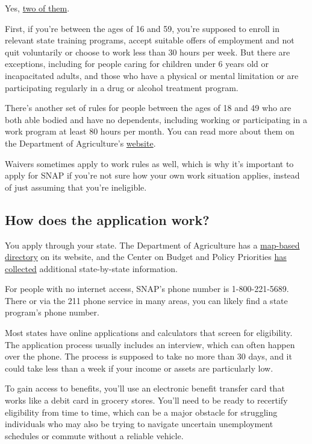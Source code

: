 Yes, \href{https://www.fns.usda.gov/snap/work-requirements}{two of
them}.

First, if you're between the ages of 16 and 59, you're supposed to
enroll in relevant state training programs, accept suitable offers of
employment and not quit voluntarily or choose to work less than 30 hours
per week. But there are exceptions, including for people caring for
children under 6 years old or incapacitated adults, and those who have a
physical or mental limitation or are participating regularly in a drug
or alcohol treatment program.

There's another set of rules for people between the ages of 18 and 49
who are both able bodied and have no dependents, including working or
participating in a work program at least 80 hours per month. You can
read more about them on the Department of Agriculture's
\href{https://www.fns.usda.gov/snap/work-requirements-policies}{website}.

Waivers sometimes apply to work rules as well, which is why it's
important to apply for SNAP if you're not sure how your own work
situation applies, instead of just assuming that you're ineligible.

\hypertarget{how-does-the-application-work}{%
\subsection{How does the application
work?}\label{how-does-the-application-work}}

You apply through your state. The Department of Agriculture has a
\href{https://www.fns.usda.gov/snap/state-directory}{map-based
directory} on its website, and the Center on Budget and Policy
Priorities
\href{https://www.cbpp.org/research/food-assistance/snap-state-by-state-data-fact-sheets-and-resources}{has
collected} additional state-by-state information.

For people with no internet access, SNAP's phone number is
1-800-221-5689. There or via the 211 phone service in many areas, you
can likely find a state program's phone number.

Most states have online applications and calculators that screen for
eligibility. The application process usually includes an interview,
which can often happen over the phone. The process is supposed to take
no more than 30 days, and it could take less than a week if your income
or assets are particularly low.

To gain access to benefits, you'll use an electronic benefit transfer
card that works like a debit card in grocery stores. You'll need to be
ready to recertify eligibility from time to time, which can be a major
obstacle for struggling individuals who may also be trying to navigate
uncertain unemployment schedules or commute without a reliable vehicle.

